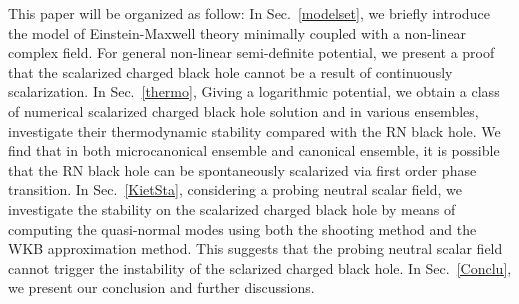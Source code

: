 \documentclass[pr, twocolumn, preprintnumbers, showpacs,footnoteadded, superscriptaddress,nofootinbib,longbibliography]{revtex4-1}
\begin{document}
This paper will be organized as follow: In Sec.~\ref{modelset}, we briefly introduce the model of Einstein-Maxwell theory minimally coupled with a non-linear complex field. For general non-linear semi-definite potential, we present a proof that the scalarized charged black hole cannot be a result of continuously scalarization. In Sec.~\ref{thermo}, Giving a logarithmic potential, we obtain a class of numerical scalarized charged black hole solution and in various ensembles, investigate their thermodynamic stability compared with the RN black hole. We find that in both microcanonical ensemble and canonical ensemble, it is possible that the RN black hole can be spontaneously scalarized via first order phase transition. In Sec.~\ref{KietSta}, considering a probing neutral scalar field, we investigate the stability on the scalarized charged black hole by means of computing the quasi-normal modes using both the shooting method and the WKB approximation method. This suggests that the probing neutral scalar field cannot trigger the instability of the sclarized charged black hole. In Sec.~\ref{Conclu}, we present our conclusion and further discussions.
\end{document}
